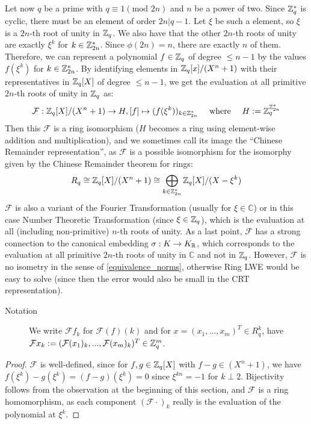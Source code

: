 Let now $q$ be a prime with $q \equiv 1 (\text{mod } 2n)$ and $n$ be a power of two. Since $\mathbb{Z}_q^*$ is cyclic, there must be an element of order $2n | q - 1$. Let $\xi$ be such a element, so $\xi$ is a $2n$-th root of unity in $\mathbb{Z}_q$. We also have that the other  $2n$-th roots of unity are exactly $\xi^k$ for $k \in \mathbb{Z}_{2n}^*$. Since $\phi(2n) = n$, there are exactly $n$ of them. Therefore, we can represent a polynomial $f \in \mathbb{Z}_q$ of degree $\leq n - 1$ by the values $f(\xi^k)$ for $k \in \mathbb{Z}_{2n}^*$. By identifying elements in $\mathbb{Z}_q[x]/(X^n+1)$ with their representatives in $\mathbb{Z}_q[X]$ of degree $\leq n - 1$, we get the evaluation at all primitive $2n$-th roots of unity in $\mathbb{Z}_q$ as:
\begin{equation}
\begin{split}
\mathcal{F}: \mathbb{Z}_q[X]/(X^n+1) \to H, [f] \mapsto (f(\xi^k))_{k \in \mathbb{Z}_{2n}^*} \quad \text{ where } \quad H := \mathbb{Z}_q^{\mathbb{Z}_{2n}^*}
\end{split}\nonumber
\end{equation}
Then this $\mathcal{F}$ is a ring isomorphism ($H$ becomes a ring using element-wise addition and multiplication), and we sometimes call its image the ``Chinese Remainder representation'', as $\mathcal{F}$ is a possible isomorphism for the isomorphy given by the Chinese Remainder theorem for rings:
\begin{equation}
R_q \cong \mathbb{Z}_q[X]/(X^n + 1) \cong \bigoplus_{k \in \mathbb{Z}_{2n}^*} \mathbb{Z}_q[X]/(X - \xi^k) \nonumber
\end{equation}
$\mathcal{F}$ is also a variant of the Fourier Transformation (usually for $\xi \in \mathbb{C}$) or in this case Number Theoretic Transformation (since $\xi \in \mathbb{Z}_q$), which is the evaluation at all (including non-primitive) $n$-th roots of unity. As a last point, $\mathcal{F}$ has a strong connection to the canonical embedding $\sigma: K \to K_{\mathbb{R}}$, which corresponds to the evaluation at all primitive $2n$-th roots of unity in $\mathbb{C}$ and not in $\mathbb{Z}_q$. However, $\mathcal{F}$ is no isometry in the sense of \ref{equivalence_norms}, otherwise Ring LWE would be easy to solve (since then the error would also be small in the CRT representation).
\begin{description}
\item[Notation] We write $\mathcal{F}f_k$ for $\mathcal{F}(f)(k)$ and for $x = (x_1, ..., x_m)^T \in R_q^k$, have $\mathcal{F}x_k := (\mathcal{F}(x_1)_k, ..., \mathcal{F}(x_m)_k)^T \in \mathbb{Z}_q^m$.
\end{description}

\begin{proof}
$\mathcal{F}$ is well-defined, since for $f, g \in \mathbb{Z}_q[X]$ with $f - g \in (X^n+1)$, we have $f(\xi^k) - g(\xi^k) = (f - g)(\xi^k) = 0$ since $\xi^{kn} = -1$ for $k \perp 2$. Bijectivity follows from the observation at the beginning of this section, and $\mathcal{F}$ is a ring homomorphism, as each component $(\mathcal{F} \cdot)_k$ really is the evaluation of the polynomial at $\xi^k$. \qedhere
\end{proof}

